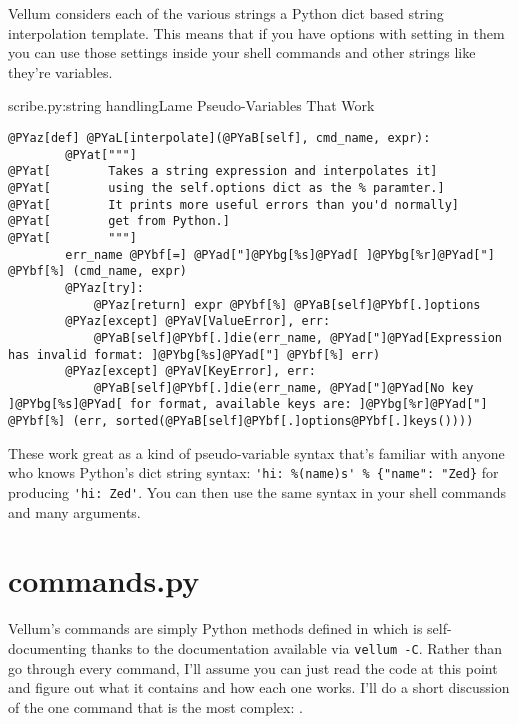Vellum considers each of the various strings a Python dict based string
interpolation template.  This means that if you have options with setting in
them you can use those settings inside your shell commands and other strings
like they're variables.

\begin{code}{scribe.py:string handling}{Lame Pseudo-Variables That Work}
\begin{Verbatim}[commandchars=@\[\]]
    @PYaz[def] @PYaL[interpolate](@PYaB[self], cmd_name, expr):
        @PYat["""]
@PYat[        Takes a string expression and interpolates it]
@PYat[        using the self.options dict as the % paramter.]
@PYat[        It prints more useful errors than you'd normally]
@PYat[        get from Python.]
@PYat[        """]
        err_name @PYbf[=] @PYad["]@PYbg[%s]@PYad[ ]@PYbg[%r]@PYad["] @PYbf[%] (cmd_name, expr)
        @PYaz[try]:
            @PYaz[return] expr @PYbf[%] @PYaB[self]@PYbf[.]options
        @PYaz[except] @PYaV[ValueError], err:
            @PYaB[self]@PYbf[.]die(err_name, @PYad["]@PYad[Expression has invalid format: ]@PYbg[%s]@PYad["] @PYbf[%] err)
        @PYaz[except] @PYaV[KeyError], err:
            @PYaB[self]@PYbf[.]die(err_name, @PYad["]@PYad[No key ]@PYbg[%s]@PYad[ for format, available keys are: ]@PYbg[%r]@PYad["] @PYbf[%] (err, sorted(@PYaB[self]@PYbf[.]options@PYbf[.]keys())))
\end{Verbatim}

\end{code}

These work great as a kind of pseudo-variable syntax that's familiar with anyone
who knows Python's dict string syntax:  \verb|'hi: %(name)s' % {"name": "Zed}|
for producing \verb|'hi: Zed'|.  You can then use the same syntax in your shell
commands and many arguments.


\section{commands.py}
\label{appendixA:commands}

Vellum's commands are simply Python methods defined in  which
is self-documenting thanks to the documentation available via \verb|vellum -C|.
Rather than go through every command, I'll assume you can just read the code at
this point and figure out what it contains and how each one works.  I'll do a
short discussion of the one command that is the most complex: .

